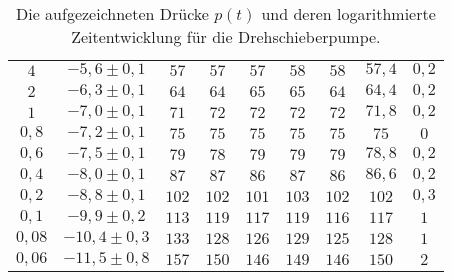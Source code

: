\begin{table}
\begin{center}
\begin{tabular}{cc|ccccc|cc}
			$4$           &                   $-5,6\pm 0,1$                    &         $57$          &         $57$          &         $57$          &         $58$          &         $58$          &          $57,4$           &           $0,2$            \\
			$2$           &                   $-6,3\pm 0,1$                    &         $64$          &         $64$          &         $65$          &         $65$          &         $64$          &          $64,4$           &           $0,2$            \\
			$1$           &                   $-7,0\pm 0,1$                    &         $71$          &         $72$          &         $72$          &         $72$          &         $72$          &          $71,8$           &           $0,2$            \\
			$0,8$          &                   $-7,2\pm 0,1$                    &         $75$          &         $75$          &         $75$          &         $75$          &         $75$          &           $75$            &            $0$             \\
			$0,6$          &                   $-7,5\pm 0,1$                    &         $79$          &         $78$          &         $79$          &         $79$          &         $79$          &          $78,8$           &           $0,2$            \\
			$0,4$          &                   $-8,0\pm 0,1$                    &         $87$          &         $87$          &         $86$          &         $87$          &         $86$          &          $86,6$           &           $0,2$            \\
			$0,2$          &                   $-8,8\pm 0,1$                    &         $102$         &         $102$         &         $101$         &         $103$         &         $102$         &           $102$           &           $0,3$            \\
			$0,1$          &                   $-9,9\pm 0,2$                    &         $113$         &         $119$         &         $117$         &         $119$         &         $116$         &           $117$           &            $1$             \\
			$0,08$          &                   $-10,4\pm 0,3$                   &         $133$         &         $128$         &         $126$         &         $129$         &         $125$         &           $128$           &            $1$             \\
			$0,06$          &                   $-11,5\pm 0,8$                   &         $157$         &         $150$         &         $146$         &         $149$         &         $146$         &           $150$           &            $2$             \\ \bottomrule
		\end{tabular}
		\caption{Die aufgezeichneten Drücke $p(t)$ und deren logarithmierte Zeitentwicklung für die Drehschieberpumpe.}
		\label{tab:tab2}
	\end{center}
\end{table}


